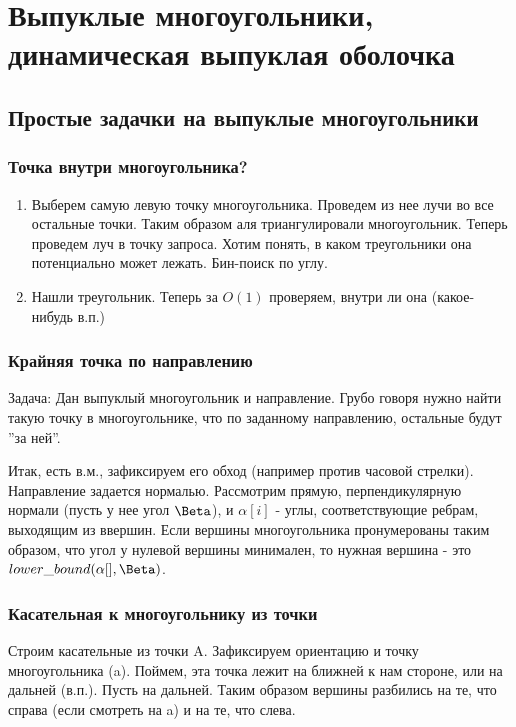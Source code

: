 
\chapter{Выпуклые многоугольники, динамическая выпуклая оболочка}

\section{Простые задачки на выпуклые многоугольники}

\subsection{Точка внутри многоугольника?}

\begin{enumerate}
    \item Выберем самую левую точку многоугольника. Проведем из нее лучи во все остальные точки. 
    Таким образом аля триангулировали многоугольник. Теперь проведем луч в точку запроса. Хотим понять, в каком треугольники она потенциально может лежать. Бин-поиск по углу. 
    \item Нашли треугольник. Теперь за $O(1)$ проверяем, внутри ли она (какое-нибудь в.п.)
\end{enumerate}

\subsection{Крайняя точка по направлению}
Задача: Дан выпуклый многоугольник и направление. Грубо говоря нужно найти такую точку в многоугольнике, что по заданному направлению, остальные будут ''за ней''. 

Итак, есть в.м., зафиксируем его обход (например против часовой стрелки). Направление задается нормалью. Рассмотрим прямую, перпендикулярную нормали 
(пусть у нее угол $\Beta$), и $\alpha[i]$ - углы, соответствующие ребрам, выходящим из ввершин. Если вершины многоугольника пронумерованы таким образом, что 
угол у нулевой вершины минимален, то нужная вершина - это $lower\_bound(\alpha[], \Beta)$.


\subsection{Касательная к многоугольнику из точки}
Строим касательные из точки A. Зафиксируем ориентацию и точку многоугольника (a). Поймем, эта точка лежит на ближней к нам стороне, или на дальней (в.п.).
Пусть на дальней. Таким образом вершины разбились на те, что справа (если смотреть на a) и на те, что слева. 

